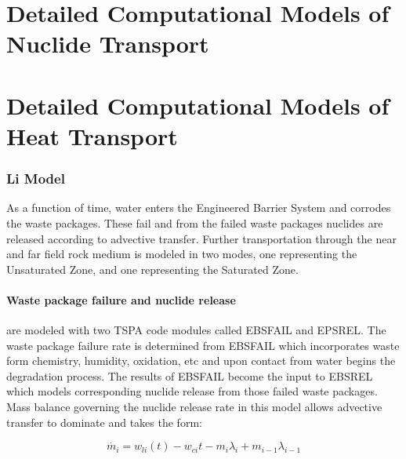 \section{Detailed Computational Models of Nuclide Transport}
\label{sec:detailed_nuclide}



\section{Detailed Computational Models of Heat Transport}
\label{sec:detailed_heat}






\subsubsection{Li Model\cite{li_methodology_2006}}
As a function of time, water enters the Engineered Barrier System and 
corrodes the waste packages.  These fail and from the failed waste 
packages nuclides are released according to advective transfer.  
Further transportation through the near and far field rock medium is 
modeled in two modes, one representing the Unsaturated Zone, and one 
representing the Saturated Zone.

\paragraph{Waste package failure and nuclide release} are modeled with 
two TSPA code modules called EBSFAIL and EPSREL. The waste package 
failure rate is determined from EBSFAIL which incorporates waste form 
chemistry, humidity, oxidation, etc and upon contact from water begins 
the degradation process. The results of EBSFAIL become the input to 
EBSREL which models corresponding nuclide release from those failed 
waste packages. Mass balance governing the nuclide release rate in 
this model allows advective transfer to dominate and takes the form:

\begin{equation}
\dot{m_i}=w_{li}(t)-w_{ci}{t}-m_i\lambda_i+m_{i-1}\lambda_{i-1}\nonumber
\end{equation}

